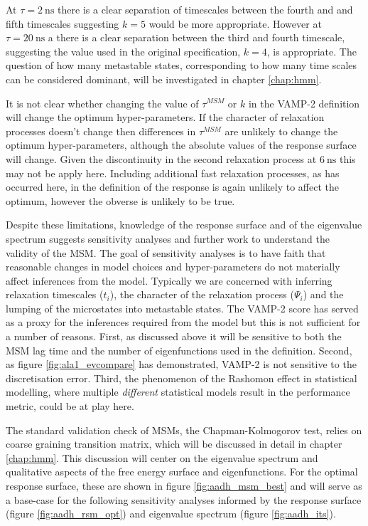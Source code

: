 At $\tau = \SI{2}{\nano\second}$ there is a clear separation of timescales between the fourth and and fifth timescales suggesting $k=5$ would be more appropriate. However at $\tau = \SI{20}{\nano\second}$ a there is a clear separation between the third and fourth timescale, suggesting the value used in the original specification, $k=4$, is appropriate.  The question of how many metastable states, corresponding to how many time scales can be considered dominant, will be investigated in chapter \ref{chap:hmm}. 

It is not clear whether changing the value of $\tau^{MSM}$ or $k$ in the VAMP-2 definition will change the optimum hyper-parameters. If the character of relaxation processes doesn't change then differences in $\tau^{MSM}$ are unlikely to change the optimum hyper-parameters, although the absolute values of the response surface will change. Given the discontinuity in the second relaxation process at $\SI{6}{\nano\second}$ this may not be apply here. Including additional fast relaxation processes, as has occurred here, in the definition of the response is again unlikely to affect the optimum, however the obverse is unlikely to be true.

Despite these limitations, knowledge of the response surface and of the eigenvalue spectrum suggests sensitivity analyses and further work to understand the validity of the MSM.  The goal of sensitivity analyses is to have faith that reasonable changes in model choices and hyper-parameters do not materially affect inferences from the model. Typically we are concerned with inferring relaxation timescales ($t_{i}$), the character of the relaxation process ($\Psi_{i}$) and the lumping of the microstates into metastable states. The VAMP-2 score has served as a proxy for the inferences required from the model but this is not sufficient  for a number of reasons.  First, as discussed above it will be sensitive to both the MSM lag time and the number of eigenfunctions used in the definition. Second, as figure \ref{fig:ala1_evcompare} has demonstrated, VAMP-2 is not sensitive to the discretisation error. Third, the phenomenon of the Rashomon effect \cite{breiman2001} in statistical modelling, where  multiple \emph{different} statistical models result in the performance metric, could be at play here.

The standard validation check of MSMs, the Chapman-Kolmogorov test, relies on coarse graining transition matrix, which will be discussed in detail in chapter \ref{chap:hmm}. This discussion will center on the eigenvalue spectrum and qualitative aspects of the free energy surface and eigenfunctions.  For the optimal response surface, these are shown in figure \ref{fig:aadh_msm_best} and will serve as a base-case for the following sensitivity analyses informed by the response surface (figure \ref{fig:aadh_rsm_opt}) and eigenvalue spectrum (figure \ref{fig:aadh_its}).

